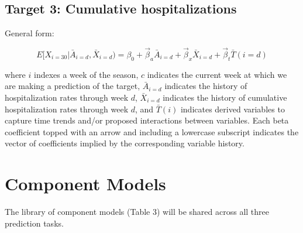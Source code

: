 \documentclass[10pt,letterpaper]{article}
\begin{document}
\hypertarget{target-3-cumulative-hospitalizations}{%
\subsection{Target 3: Cumulative
hospitalizations}\label{target-3-cumulative-hospitalizations}}

General form:

\[E[X_{i=30} | \bar{A}_{i=d}, \bar{X}_{i=d}) = \beta_0 + \vec{\beta}_a \bar{A}_{i=d} + \vec{\beta}_x \bar{X}_{i=d} + \vec{\beta}_t \bar{T}(i=d)\]

where \(i\) indexes a week of the season, \(c\) indicates the current
week at which we are making a prediction of the target,
\(\bar{A}_{i=d}\) indicates the history of hospitalization rates through
week \(d\), \(\bar{X}_{i=d}\) indicates the history of cumulative
hospitalization rates through week \(d\), and \(\bar{T}(i)\) indicates
derived variables to capture time trends and/or proposed interactions
between variables. Each beta coefficient topped with an arrow and
including a lowercase subscript indicates the vector of coefficients
implied by the corresponding variable history.

\hypertarget{component-models}{%
\section{Component Models}\label{component-models}}

The library of component models (Table 3) will be shared across all
three prediction tasks.
\end{document}

